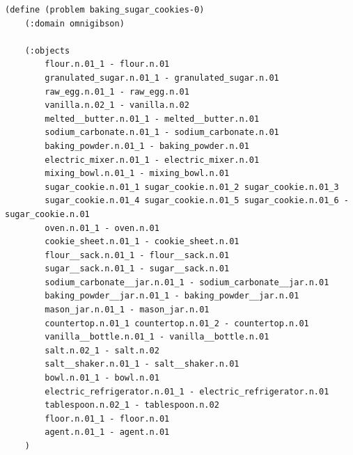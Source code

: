 \noindent\begin{minipage}[t]{0.85\textwidth}
\begin{lstlisting}[style = mystyle,
  caption={{\texttt{BakingSugarCookies}}}, label={lst:bddl3}]
(define (problem baking_sugar_cookies-0)
    (:domain omnigibson)

    (:objects
        flour.n.01_1 - flour.n.01
        granulated_sugar.n.01_1 - granulated_sugar.n.01
        raw_egg.n.01_1 - raw_egg.n.01
        vanilla.n.02_1 - vanilla.n.02
        melted__butter.n.01_1 - melted__butter.n.01
        sodium_carbonate.n.01_1 - sodium_carbonate.n.01
        baking_powder.n.01_1 - baking_powder.n.01
        electric_mixer.n.01_1 - electric_mixer.n.01
        mixing_bowl.n.01_1 - mixing_bowl.n.01
        sugar_cookie.n.01_1 sugar_cookie.n.01_2 sugar_cookie.n.01_3
        sugar_cookie.n.01_4 sugar_cookie.n.01_5 sugar_cookie.n.01_6 - sugar_cookie.n.01
        oven.n.01_1 - oven.n.01
        cookie_sheet.n.01_1 - cookie_sheet.n.01
        flour__sack.n.01_1 - flour__sack.n.01
        sugar__sack.n.01_1 - sugar__sack.n.01
        sodium_carbonate__jar.n.01_1 - sodium_carbonate__jar.n.01
        baking_powder__jar.n.01_1 - baking_powder__jar.n.01
        mason_jar.n.01_1 - mason_jar.n.01
        countertop.n.01_1 countertop.n.01_2 - countertop.n.01
        vanilla__bottle.n.01_1 - vanilla__bottle.n.01
        salt.n.02_1 - salt.n.02
        salt__shaker.n.01_1 - salt__shaker.n.01
        bowl.n.01_1 - bowl.n.01
        electric_refrigerator.n.01_1 - electric_refrigerator.n.01
        tablespoon.n.02_1 - tablespoon.n.02
        floor.n.01_1 - floor.n.01
        agent.n.01_1 - agent.n.01
    )
    

\end{lstlisting}
\end{minipage}
